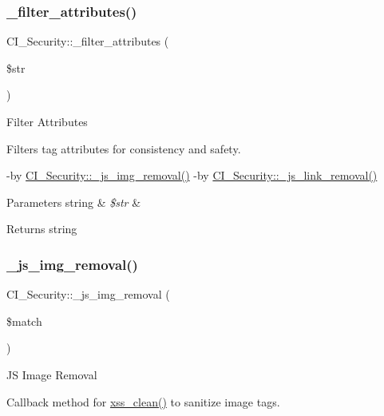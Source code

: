 \subsubsection{\texorpdfstring{\+\_\+filter\+\_\+attributes()}{\_filter\_attributes()}}
{\footnotesize\ttfamily C\+I\+\_\+\+Security\+::\+\_\+filter\+\_\+attributes (\begin{DoxyParamCaption}\item[{}]{\$str }\end{DoxyParamCaption})\hspace{0.3cm}{\ttfamily [protected]}}

Filter Attributes

Filters tag attributes for consistency and safety.

-\/by \mbox{\hyperlink{class_c_i___security_ad2795f9f809d310f0a0d2f5cad87a81d}{C\+I\+\_\+\+Security\+::\+\_\+js\+\_\+img\+\_\+removal()}} -\/by \mbox{\hyperlink{class_c_i___security_a3e09d1f7fdc47de100df6e40fdb44b72}{C\+I\+\_\+\+Security\+::\+\_\+js\+\_\+link\+\_\+removal()}} 
\begin{DoxyParams}[1]{Parameters}
string & {\em \$str} & \\
\hline
\end{DoxyParams}
\begin{DoxyReturn}{Returns}
string 
\end{DoxyReturn}
\mbox{\label{class_c_i___security_ad2795f9f809d310f0a0d2f5cad87a81d}} 
\subsubsection{\texorpdfstring{\+\_\+js\+\_\+img\+\_\+removal()}{\_js\_img\_removal()}}
{\footnotesize\ttfamily C\+I\+\_\+\+Security\+::\+\_\+js\+\_\+img\+\_\+removal (\begin{DoxyParamCaption}\item[{}]{\$match }\end{DoxyParamCaption})\hspace{0.3cm}{\ttfamily [protected]}}

JS Image Removal

Callback method for \mbox{\hyperlink{class_c_i___security_a2a5bb2a641bd37cbae73a96ee35dee30}{xss\+\_\+clean()}} to sanitize image tags.


